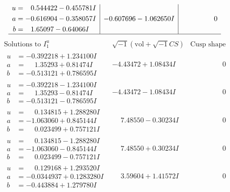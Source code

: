 \documentclass[1p]{elsarticle_modified}
\theoremstyle{definition}
\newcommand{\I}{\sqrt{-1}}
\begin{document}
$$\begin{array}{c|c|c}
\begin{aligned}
u &= \phantom{-}0.544422 - 0.455781 I \\
a &= -0.616904 - 0.358057 I \\
b &= \phantom{-}1.65097 - 0.64066 I\end{aligned}
 & -0.607696 - 1.062650 I & \phantom{-0.000000 } 0\\
 \hline 
 \end{array}$$\newpage$$\begin{array}{c|c|c}  
\text{Solutions to }I^u_{1}& \I (\text{vol} + \sqrt{-1}CS) & \text{Cusp shape}\\
 \hline 
\begin{aligned}
u &= -0.392218 + 1.234100 I \\
a &= \phantom{-}1.35293 + 0.81474 I \\
b &= -0.513121 + 0.786595 I\end{aligned}
 & -4.43472 + 1.08434 I & \phantom{-0.000000 } 0 \\ \hline\begin{aligned}
u &= -0.392218 - 1.234100 I \\
a &= \phantom{-}1.35293 - 0.81474 I \\
b &= -0.513121 - 0.786595 I\end{aligned}
 & -4.43472 - 1.08434 I & \phantom{-0.000000 } 0 \\ \hline\begin{aligned}
u &= \phantom{-}0.134815 + 1.288280 I \\
a &= -1.063060 + 0.845144 I \\
b &= \phantom{-}0.023499 + 0.757121 I\end{aligned}
 & \phantom{-}7.48550 - 0.30234 I & \phantom{-0.000000 } 0 \\ \hline\begin{aligned}
u &= \phantom{-}0.134815 - 1.288280 I \\
a &= -1.063060 - 0.845144 I \\
b &= \phantom{-}0.023499 - 0.757121 I\end{aligned}
 & \phantom{-}7.48550 + 0.30234 I & \phantom{-0.000000 } 0 \\ \hline\begin{aligned}
u &= \phantom{-}0.129168 + 1.293520 I \\
a &= -0.0344937 + 0.1283280 I \\
b &= -0.443884 + 1.279780 I\end{aligned}
 & \phantom{-}3.59604 + 1.41572 I & \phantom{-0.000000 } 0 \\ \hline\begin{aligned}

\end{aligned}
\end{array}$$
\end{document}
